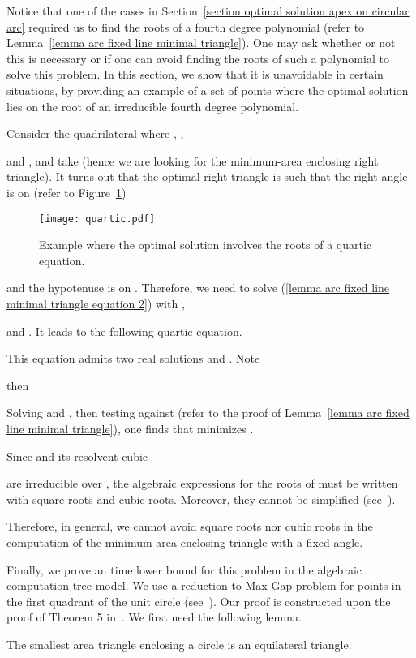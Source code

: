 \documentclass[11pt, oneside]{article}
\begin{document}
Notice that one of the cases 
in Section~\ref{section optimal solution apex on circular arc} 
required us to find the roots of a fourth degree polynomial
(refer to Lemma~\ref{lemma arc fixed line minimal triangle}). 
One may ask whether or not 
this is necessary or if one can avoid 
finding the roots of such a polynomial
to solve this problem.
In this section, 
we show that it is unavoidable in certain situations, 
by providing an example of a set of points 
where the optimal solution lies on the root 
of an irreducible fourth degree polynomial.

Consider the quadrilateral  where
,
,

and ,
and take 
(hence we are looking for the minimum-area enclosing right triangle).
It turns out that the optimal right triangle
is such that the right angle is on 
(refer to Figure~\ref{figure quartic})
\begin{figure}
\centering
\texttt{[image: quartic.pdf]}
\caption{Example where the optimal solution involves the roots of a quartic equation.\label{figure quartic}}
\end{figure}
and the hypotenuse is on .
Therefore, 
we need to solve (\ref{lemma arc fixed line minimal triangle equation 2})
with ,

and .
It leads to the following quartic equation.

This equation admits two real solutions  and .
Note 

then

Solving 
and ,
then testing against 
(refer to the proof of Lemma~\ref{lemma arc fixed line minimal triangle}),
one finds that 
minimizes .

Since  and its resolvent cubic

are irreducible over ,
the algebraic expressions for the roots of  must be written 
with square roots and cubic roots.
Moreover,
they cannot be simplified (see~\cite{dummit}).

Therefore, 
in general, 
we cannot avoid square roots
nor cubic roots in
the computation of the minimum-area enclosing triangle
with a fixed angle.

Finally,
we prove an  time lower bound for this problem
in the algebraic computation tree model.
We use a reduction to Max-Gap problem for points in the first quadrant
of the unit circle (see~\cite{DBLP:journals/algorithmica/LeeW86}).
Our proof is constructed upon the proof of Theorem 5 in~\cite{DBLP:journals/ijcga/BoseMSS11}.
We first need the following lemma.
\begin{lemma}
\label{lemma smallest triangle circle}
The smallest area triangle enclosing a circle is an equilateral triangle.
\end{lemma}
\end{document}
